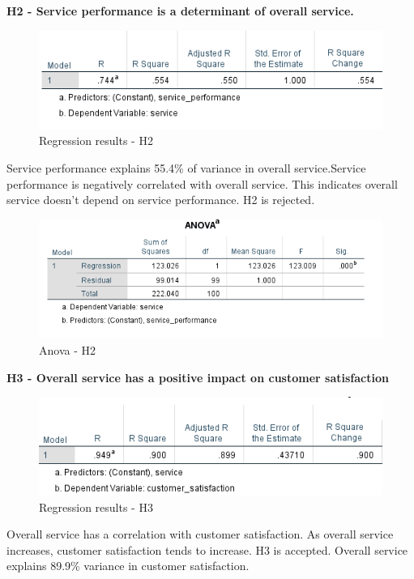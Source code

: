 \documentclass[a4paper, 12pt]{extarticle}
\begin{document}
{\par \textbf{H2 - Service performance is a determinant of overall service.}\\
\begin{figure}[H]
\centering
\includegraphics[scale=1]{service_performance_vs_service.png}
\caption{Regression results - H2}
\end{figure}

Service performance explains 55.4\% of variance in overall service.Service performance is negatively correlated with overall service. This indicates overall service doesn't depend on service performance. H2 is rejected.

\begin{figure}[H]
\centering
\includegraphics[scale=1]{anova_s_sp.png}
\caption{Anova - H2}
\end{figure}

\par \textbf{H3 - Overall service has a positive impact on customer satisfaction}\\
\begin{figure}[H]
\centering
\includegraphics[scale=1]{sp_vs_cs.png}
\caption{Regression results - H3}
\end{figure}

Overall service has a correlation with customer satisfaction. As overall service increases, customer satisfaction tends to increase. H3 is accepted.
Overall service explains 89.9\% variance in customer satisfaction.

}
\end{document}
